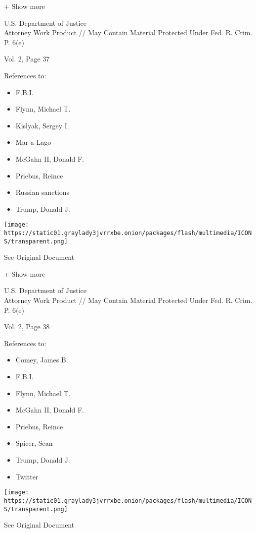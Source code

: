 + Show more

U.S. Department of Justice\\
Attorney Work Product // May Contain Material Protected Under Fed. R.
Crim. P. 6(e)

Vol. 2, Page 37

References to:

\begin{itemize}
\tightlist
\item
  F.B.I.
\item
  Flynn, Michael T.
\item
  Kislyak, Sergey I.
\item
  Mar-a-Lago
\item
  McGahn II, Donald F.
\item
  Priebus, Reince
\item
  Russian sanctions
\item
  Trump, Donald J.
\end{itemize}

\protect\hyperlink{}{}

\texttt{[image: https://static01.graylady3jvrrxbe.onion/packages/flash/multimedia/ICONS/transparent.png]}

See Original Document

+ Show more

U.S. Department of Justice\\
Attorney Work Product // May Contain Material Protected Under Fed. R.
Crim. P. 6(e)

Vol. 2, Page 38

References to:

\begin{itemize}
\tightlist
\item
  Comey, James B.
\item
  F.B.I.
\item
  Flynn, Michael T.
\item
  McGahn II, Donald F.
\item
  Priebus, Reince
\item
  Spicer, Sean
\item
  Trump, Donald J.
\item
  Twitter
\end{itemize}

\protect\hyperlink{}{}

\texttt{[image: https://static01.graylady3jvrrxbe.onion/packages/flash/multimedia/ICONS/transparent.png]}

See Original Document

